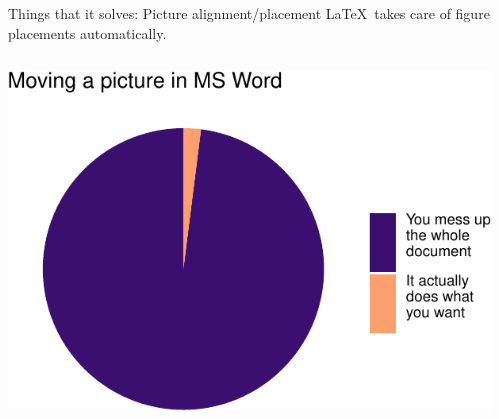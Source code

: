 \documentclass[,aspectratio=43]{beamer}
\begin{document}
\begin{frame}{Things that it solves: Picture alignment/placement}
\protect\hypertarget{things-that-it-solves-picture-alignmentplacement}{}
\LaTeX~takes care of figure placements automatically.

\begin{columns}[T]
\begin{column}{0.64\textwidth}
\begin{center}\includegraphics{figure/piechart-1} \end{center}
\end{column}

\begin{column}{0.33\textwidth}
\vspace{2em}


\end{column}
\end{columns}
\end{frame}
\end{document}
